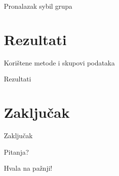 \documentclass{beamer}
\begin{document}
\begin{frame}{Pronalazak sybil grupa}
  \begin{itemize}
  \end{itemize}
\end{frame}

\section{Rezultati}

\begin{frame}{Korištene metode i skupovi podataka}
  \begin{itemize}
  \end{itemize}
\end{frame}

\begin{frame}{Rezultati}
  \begin{itemize}
  \end{itemize}
\end{frame}

\section{Zaključak}

\begin{frame}{Zaključak}
  \begin{itemize}
  \end{itemize}
\end{frame}

\begin{frame}[standout]
  \Huge{\centerline{Pitanja?}}
\end{frame}

\begin{frame}[standout]
  \Huge{\centerline{Hvala na pažnji!}}
\end{frame}
\end{document}
